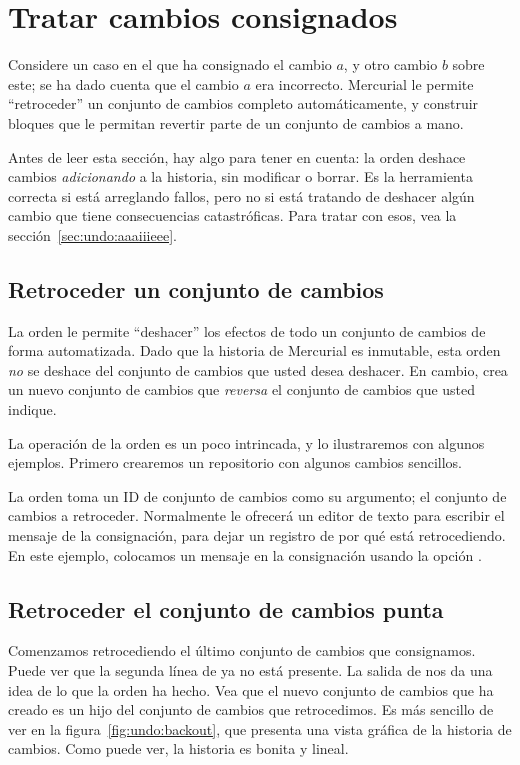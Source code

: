 \section{Tratar cambios consignados}

Considere un caso en el que ha consignado el cambio $a$, y otro cambio
$b$ sobre este; se ha dado cuenta que el cambio $a$ era
incorrecto. Mercurial le permite ``retroceder'' un conjunto de cambios
completo automáticamente, y construir bloques que le permitan revertir
parte de un conjunto de cambios a mano.

Antes de leer esta sección, hay algo para tener en cuenta: la orden
 deshace cambios \emph{adicionando} a la historia, sin
modificar o borrar.  Es la herramienta correcta si está arreglando
fallos, pero no si está tratando de deshacer algún cambio que tiene
consecuencias catastróficas.  Para tratar con esos, vea la sección~\ref{sec:undo:aaaiiieee}.

\subsection{Retroceder un conjunto de cambios}

La orden  le permite ``deshacer'' los efectos de todo
un conjunto de cambios de forma automatizada.  Dado que la historia de
Mercurial es inmutable, esta orden \emph{no} se deshace del conjunto
de cambios que usted desea deshacer.  En cambio, crea un nuevo
conjunto de cambios que \emph{reversa} el conjunto de cambios que
usted indique.

La operación de la orden  es un poco intrincada, y lo
ilustraremos con algunos ejemplos. Primero crearemos un repositorio
con algunos cambios sencillos.

La orden  toma un ID de conjunto de cambios como su
argumento; el conjunto de cambios a retroceder. Normalmente
 le ofrecerá un editor de texto para escribir el
mensaje de la consignación, para dejar un registro de por qué está
retrocediendo. En este ejemplo, colocamos un mensaje en la
consignación usando la opción  .

\subsection{Retroceder el conjunto de cambios punta}

Comenzamos retrocediendo el último conjunto de cambios que consignamos.
Puede ver que la segunda línea de  ya no está
presente.  La salida de  nos da una idea de lo que la orden
 ha hecho.
Vea que el nuevo conjunto de cambios que  ha creado es
un hijo del conjunto de cambios que retrocedimos. Es más sencillo de
ver en la figura~\ref{fig:undo:backout}, que presenta una vista
gráfica de la historia de cambios.  Como puede ver, la historia es
bonita y lineal.

